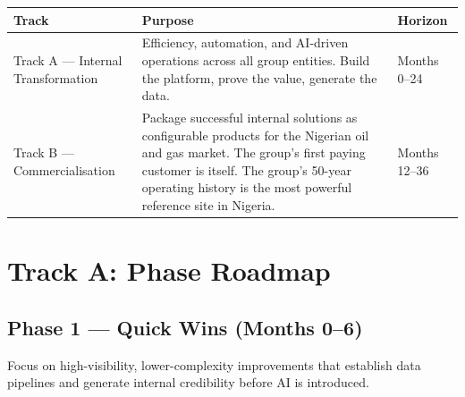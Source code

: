 \documentclass[10pt]{article}
\begin{document}
\vspace{6pt}

\small
\begin{tabularx}{\columnwidth}{@{}lXl@{}}
\toprule
\textbf{Track} & \textbf{Purpose} & \textbf{Horizon} \\
\midrule
Track A --- Internal Transformation
  & Efficiency, automation, and AI-driven operations across all group entities.
    Build the platform, prove the value, generate the data.
  & Months 0--24 \\[4pt]
Track B --- Commercialisation
  & Package successful internal solutions as configurable products for the
    Nigerian oil and gas market. The group's first paying customer is itself.
    The group's 50-year operating history is the most powerful reference site
    in Nigeria.
  & Months 12--36 \\
\bottomrule
\end{tabularx}
\normalsize

\vspace{10pt}

\section{Track A: Phase Roadmap}

\subsection*{Phase 1 --- Quick Wins (Months 0--6)}

{\small
Focus on high-visibility, lower-complexity improvements that establish data
pipelines and generate internal credibility before AI is introduced.}
\end{document}
